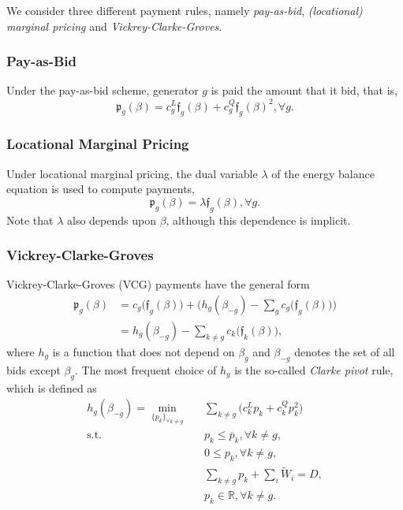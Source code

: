\documentclass{article}
\begin{document}
We consider three different payment rules, namely \textit{pay-as-bid}, \textit{(locational) marginal pricing} and \textit{Vickrey-Clarke-Groves}.

\subsubsection{Pay-as-Bid}

Under the pay-as-bid scheme, generator $g$ is paid the amount that it bid, that is,
\begin{equation*}
\mathfrak{p}_g(\beta) = c_g^L \mathfrak{f}_g(\beta) + c_g^Q \mathfrak{f}_g(\beta)^2, \forall g.
\end{equation*}

\subsubsection{Locational Marginal Pricing}

Under locational marginal pricing, the dual variable $\lambda$ of the energy balance equation is used to compute payments,
\begin{equation*}
\mathfrak{p}_g(\beta) = \lambda \mathfrak{f}_g(\beta), \forall g.
\end{equation*}
Note that $\lambda$ also depends upon $\beta$, although this dependence is implicit.

\subsubsection{Vickrey-Clarke-Groves}

Vickrey-Clarke-Groves (VCG) payments have the general form
\begin{align*}
\mathfrak{p}_g(\beta) &= c_g\big(\mathfrak{f}_g(\beta)\big) + \Big(h_g(\beta_{-g}) - \sum_{g} c_g\big(\mathfrak{f}_g(\beta)\big) \Big)\\
&= h_g(\beta_{-g}) - \sum_{k \ne g} c_k\big(\mathfrak{f}_k(\beta)\big),
\end{align*}
where $h_g$ is a function that does not depend on $\beta_g$ and $\beta_{-g}$ denotes the set of all bids except $\beta_g$. The most frequent choice of $h_g$ is the so-called \textit{Clarke pivot} rule, which is defined as
\begin{align}
h_g(\beta_{-g}) = \underset{\{p_k\}_{\forall k \ne g}}{\min} \hspace{10pt} & \sum_{k \ne g} \Big(c_k^Lp_k + c_k^Q p_k^2 \Big)\\
\mbox{s.t. } & p_k \le \overline{p}_k,\forall k \ne g,\\
& 0 \le p_k,\forall k \ne g,\\
& \sum_{k \ne g} p_k + \sum_i \tilde{W}_i = D,\\
& p_k \in \mathbb{R}, \forall k \ne g.
\end{align}
\end{document}
